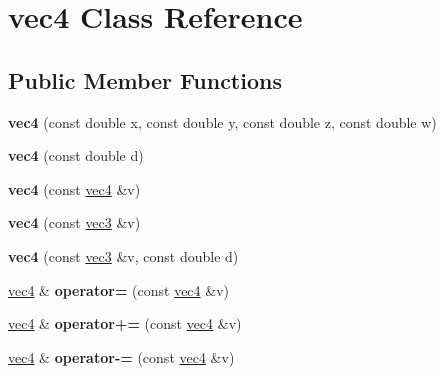 \hypertarget{classvec4}{
\section{vec4 Class Reference}
\label{classvec4}
}
\subsection*{Public Member Functions}
\begin{DoxyCompactItemize}
\item 
\hypertarget{classvec4_a9962dece3de76d54b20a7859a665e334}{
{\bfseries vec4} (const double x, const double y, const double z, const double w)}
\label{classvec4_a9962dece3de76d54b20a7859a665e334}

\item 
\hypertarget{classvec4_a9bf7f2fa0226a55ef6b655d970a1d204}{
{\bfseries vec4} (const double d)}
\label{classvec4_a9bf7f2fa0226a55ef6b655d970a1d204}

\item 
\hypertarget{classvec4_acccb915903f97605879d62049357c2b4}{
{\bfseries vec4} (const \hyperlink{classvec4}{vec4} \&v)}
\label{classvec4_acccb915903f97605879d62049357c2b4}

\item 
\hypertarget{classvec4_a977090532e2baca5d9b0affd029fab7d}{
{\bfseries vec4} (const \hyperlink{classvec3}{vec3} \&v)}
\label{classvec4_a977090532e2baca5d9b0affd029fab7d}

\item 
\hypertarget{classvec4_a105fc8545ae1879b30f5aab691e6a0c5}{
{\bfseries vec4} (const \hyperlink{classvec3}{vec3} \&v, const double d)}
\label{classvec4_a105fc8545ae1879b30f5aab691e6a0c5}

\item 
\hypertarget{classvec4_aed2a473c8d724973efb4ede93a2a5e95}{
\hyperlink{classvec4}{vec4} \& {\bfseries operator=} (const \hyperlink{classvec4}{vec4} \&v)}
\label{classvec4_aed2a473c8d724973efb4ede93a2a5e95}

\item 
\hypertarget{classvec4_a16d10f2ed44304fb1309f959f245ca52}{
\hyperlink{classvec4}{vec4} \& {\bfseries operator+=} (const \hyperlink{classvec4}{vec4} \&v)}
\label{classvec4_a16d10f2ed44304fb1309f959f245ca52}

\item 
\hypertarget{classvec4_a88f2ead88470beaa5204573d3862166e}{
\hyperlink{classvec4}{vec4} \& {\bfseries operator-\/=} (const \hyperlink{classvec4}{vec4} \&v)}
\label{classvec4_a88f2ead88470beaa5204573d3862166e}


\end{DoxyCompactItemize}
